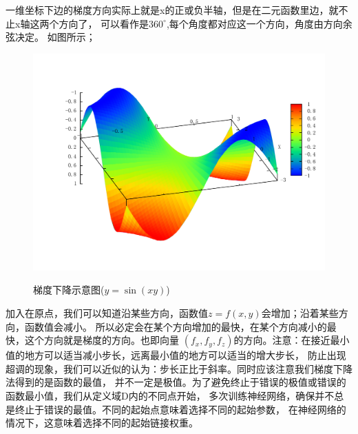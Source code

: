 \documentclass[12pt]{article}
\begin{document}
    一维坐标下边的梯度方向实际上就是x的正或负半轴，但是在二元函数里边，就不止x轴这两个方向了，
    可以看作是$360^{\circ}$,每个角度都对应这一个方向，角度由方向余弦决定。
    如图所示；
    \begin{figure}[!htb]
        \centering
        \includegraphics[scale=0.5]{./picture/梯度示意图.pdf}
        \label{梯度下降}
        \caption{梯度下降示意图($y=\sin(xy)$)}
    \end{figure}
    加入在原点，我们可以知道沿某些方向，函数值$z=f(x,y)$会增加；沿着某些方向，函数值会减小。
    所以必定会在某个方向增加的最快，在某个方向减小的最快，这个方向就是梯度的方向。也即向量
    $(f_x,f_y,f_z)$的方向。注意：在接近最小值的地方可以适当减小步长，远离最小值的地方可以适当的增大步长，
    防止出现超调的现象，我们可以近似的认为：步长正比于斜率。同时应该注意我们梯度下降法得到的是函数的最值，
    并不一定是极值。为了避免终止于错误的极值或错误的函数最小值，我们从定义域D内的不同点开始，
    多次训练神经网络，确保并不总是终止于错误的最值。不同的起始点意味着选择不同的起始参数，
    在神经网络的情况下，这意味着选择不同的起始链接权重。
\end{document}
